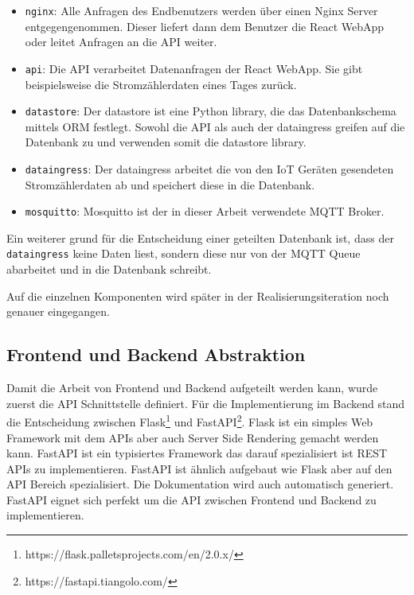 \begin{itemize}
    \item \texttt{nginx}:
          Alle Anfragen des Endbenutzers werden über einen Nginx Server
          entgegengenommen. Dieser liefert dann dem Benutzer die React WebApp
          oder leitet Anfragen an die \ac{API} weiter.

    \item \texttt{api}:
          Die \ac{API} verarbeitet Datenanfragen der React WebApp. Sie gibt
          beispielsweise die Stromzählerdaten eines Tages zurück.

    \item \texttt{datastore}:
          Der datastore ist eine Python library, die das Datenbankschema mittels \ac{ORM} festlegt.
          Sowohl die \ac{API} als auch der dataingress greifen auf die Datenbank zu
          und verwenden somit die datastore library.

    \item \texttt{dataingress}:
          Der dataingress arbeitet die von den \ac{IoT} Geräten gesendeten
          Stromzählerdaten ab und speichert diese in die Datenbank.

    \item \texttt{mosquitto}:
          Mosquitto ist der in dieser Arbeit verwendete \ac{MQTT} Broker.
\end{itemize}

Ein weiterer grund für die Entscheidung einer geteilten Datenbank ist,
dass der \texttt{dataingress} keine Daten liest, sondern diese nur von
der \ac{MQTT} Queue abarbeitet und in die Datenbank schreibt.

Auf die einzelnen Komponenten wird später in der Realisierungsiteration noch genauer
eingegangen.



\subsection{Frontend und Backend Abstraktion}

Damit die Arbeit von Frontend und Backend aufgeteilt werden kann, wurde zuerst
die \ac{API} Schnittstelle definiert. Für die Implementierung im Backend
stand die Entscheidung zwischen Flask\footnote{https://flask.palletsprojects.com/en/2.0.x/}
und FastAPI\footnote{https://fastapi.tiangolo.com/}.
Flask ist ein simples Web Framework mit dem \ac{API}s aber auch Server Side Rendering \parencite{flask_server_side}
gemacht werden kann. FastAPI ist ein typisiertes Framework das darauf spezialisiert ist
\ac{REST} \ac{API}s zu implementieren. FastAPI ist ähnlich aufgebaut wie Flask aber auf den
\ac{API} Bereich spezialisiert. Die Dokumentation wird auch automatisch generiert.
FastAPI eignet sich perfekt um die \ac{API} zwischen Frontend und Backend zu implementieren.

